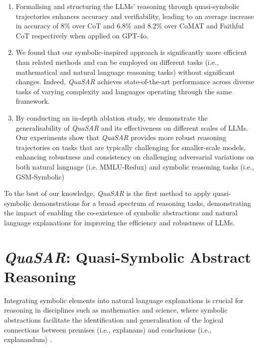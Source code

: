 \documentclass[11pt]{article}
\newcommand{\QuaSAR}{\emph{QuaSAR}\xspace}
\begin{document}
\begin{enumerate}
    \item Formalising and structuring the LLMs' reasoning through quasi-symbolic trajectories enhances accuracy and verifiability, leading to an average increase in accuracy of 8\% over CoT and 6.8\% and 8.2\% over CoMAT \cite{leang2024comatchainmathematicallyannotated} and Faithful CoT \cite{lyu2023faithful} respectively when applied on GPT-4o.
    \item We found that our symbolic-inspired approach is significantly more efficient than related methods and can be employed on different tasks (i.e., mathematical and natural language reasoning tasks) without significant changes. Indeed, \QuaSAR achieves state-of-the-art performance across diverse tasks of varying complexity and languages operating through the same framework.
    \item By conducting an in-depth ablation study, we demonstrate the generalisability of \QuaSAR and its effectiveness on different scales of LLMs. Our experiments show that \QuaSAR provides more robust reasoning trajectories on tasks that are typically challenging  for smaller-scale models, enhancing robustness and consistency on challenging adversarial variations on both natural language (i.e. MMLU-Redux) and symbolic reasoning tasks (i.e., GSM-Symbolic)
\end{enumerate}


To the best of our knowledge, \QuaSAR is the first method to apply quasi-symbolic demonstrations for a broad spectrum of reasoning tasks, demonstrating the impact of enabling the co-existence of symbolic abstractions and natural language explanations for improving the efficiency and robustness of LLMs.

\section{\QuaSAR: Quasi-Symbolic Abstract Reasoning}
\label{sec:methods}

Integrating symbolic elements into natural language explanations is crucial for reasoning in disciplines such as mathematics and science, where symbolic abstractions facilitate the identification and generalisation of the logical connections between premises (i.e., explanans) and conclusions (i.e., explanandum) \cite{Wang1954,Bronkhorst2019, PENNINGTON1993123,valentino2024nature,MILLER20191}.
\end{document}
